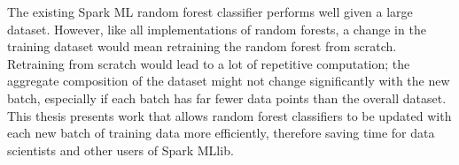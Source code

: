 The existing Spark ML random forest classifier performs well given a large
dataset. However, like all implementations of random forests, a change in the
training dataset would mean retraining the random forest from scratch.
Retraining from scratch would lead to a lot of repetitive computation; the
aggregate composition of the dataset might not change significantly with the
new batch, especially if each batch has far fewer data points than the overall
dataset. This thesis presents work that allows random forest classifiers to be
updated with each new batch of training data more efficiently, therefore saving
time for data scientists and other users of Spark MLlib.
